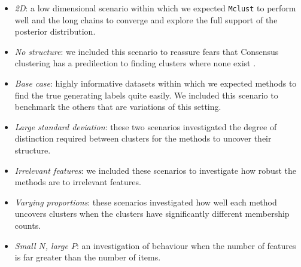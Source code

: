 \documentclass[]{article}
\begin{document}
\begin{itemize}
	\item \emph{2D}: a low dimensional scenario within which we expected \texttt{Mclust} to perform well and the long chains to converge and explore the full support of the posterior distribution.
	\item \emph{No structure}: we included this scenario to reassure fears that Consensus clustering has a predilection to finding clusters where none exist \citep{senbabaoglu2014reassessment,senbabaouglu2014critical}.
	\item \emph{Base case}: highly informative datasets within which we expected methods to find the true generating labels quite easily. We included this scenario to benchmark the others that are variations of this setting.
	\item \emph{Large standard deviation}: these two scenarios investigated the degree of distinction required between clusters for the methods to uncover their structure.
	\item \emph{Irrelevant features}: we included these scenarios to investigate how robust the methods are to irrelevant features.
	\item \emph{Varying proportions}: these scenarios investigated how well each method uncovers clusters when the clusters have significantly different membership counts.
	\item \emph{Small $N$, large $P$}: an investigation of behaviour when the number of features is far greater than the number of items.
\end{itemize}
\end{document}
